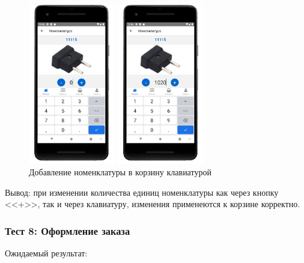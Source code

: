 \begin{figure}[!htb]
\begin{minipage}{0.49\textwidth}
\begin{minipage}{0.40\textwidth}
            \includegraphics[height=7cm]
            {images/mobile/basket/basket_3.png}
        \end{minipage}
        \begin{minipage}{0.40\textwidth}
            \centering
    
            \includegraphics[height=7cm]
            {images/mobile/basket/basket_4.png}
        \end{minipage}

        \caption{Добавление номенклатуры в корзину клавиатурой}
        \label{fig:test_basket_keyboard}
    \end{minipage}   
\end{figure}

Вывод: при изменении количества единиц номенклатуры как через кнопку <<+>>, так и через клавиатуру, изменения применеются к корзине корректно.

\subsubsection*{Тест 8: Оформление заказа}

Ожидаемый результат:

